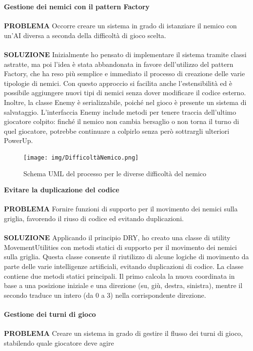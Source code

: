 \documentclass[a4paper,12pt]{report}
\begin{document}
\textbf{Gestione dei nemici con il pattern Factory}
\\
\\
\textbf{PROBLEMA}
Occorre creare un sistema in grado di istanziare il nemico con un’AI diversa a seconda della difficoltà di gioco scelta.
\\
\\
\textbf{SOLUZIONE}
Inizialmente ho pensato di implementare il sistema tramite classi astratte, ma poi l’idea è stata abbandonata in favore 
dell’utilizzo del pattern Factory, che ha reso più semplice e immediato il processo di creazione delle varie tipologie di nemici.
Con questo approccio si facilita anche l’estensibilità ed è possibile aggiungere nuovi tipi di nemici senza dover modificare 
il codice esterno. Inoltre, la classe Enemy è serializzabile, poiché nel gioco è presente un sistema di salvataggio.
L’interfaccia Enemy include metodi per tenere traccia dell’ultimo giocatore colpito: finché il nemico non cambia bersaglio o 
non torna il turno di quel giocatore, potrebbe continuare a colpirlo senza però sottrargli ulteriori PowerUp.
\begin{figure}[H]
	\centering{}
	\texttt{[image: img/DifficoltàNemico.png]}
	\caption{Schema UML del processo per le diverse difficoltà del nemico}
	\label{img:Pattern Factory}
\end{figure}
\noindent\textbf{Evitare la duplicazione del codice}
\\
\\
\textbf{PROBLEMA}
Fornire funzioni di supporto per il movimento dei nemici sulla griglia, favorendo il riuso di codice ed evitando duplicazioni.
\\
\\
\textbf{SOLUZIONE}
Applicando il principio DRY, ho creato una classe di utility MovementUtilities con metodi statici di supporto 
per il movimento dei nemici sulla griglia. Questa classe consente il riutilizzo di alcune logiche di movimento 
da parte delle varie intelligenze artificiali, evitando duplicazioni di codice.
La classe contiene due metodi statici principali. Il primo calcola la nuova coordinata in base a una posizione iniziale e
una direzione (su, giù, destra, sinistra), mentre il secondo traduce un intero (da 0 a 3) nella corrispondente direzione. 
\\
\\
\textbf{Gestione dei turni di gioco}
\\
\\
\textbf{PROBLEMA}
Creare un sistema in grado di gestire il flusso dei turni di gioco, stabilendo quale giocatore deve agire 
\end{document}
